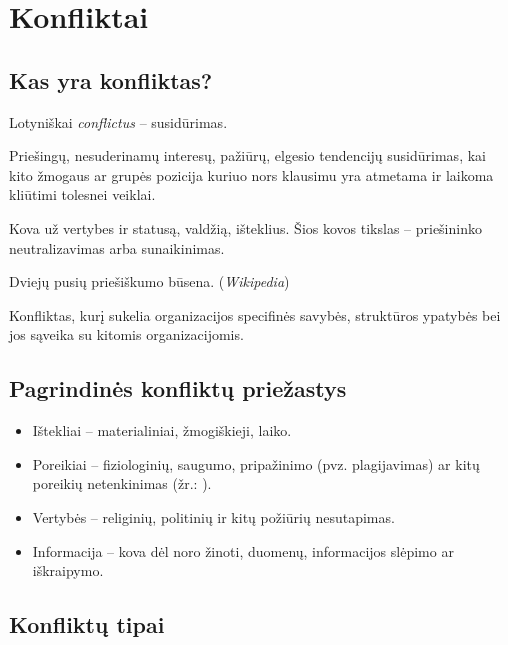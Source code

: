 \chapter{Konfliktai}

\section{Kas yra konfliktas?}

Lotyniškai \emph{conflictus} – susidūrimas.

\begin{defn}[Konfliktas]
  Priešingų, nesuderinamų interesų, pažiūrų, elgesio tendencijų
  susidūrimas, kai kito žmogaus ar grupės pozicija kuriuo nors
  klausimu yra atmetama ir laikoma kliūtimi tolesnei veiklai.
\end{defn}


\begin{defn}[Konfliktas]
  Kova už vertybes ir statusą, valdžią, išteklius. Šios kovos tikslas
  – priešininko neutralizavimas arba sunaikinimas.
\end{defn}

\begin{defn}[Konfliktas]
  Dviejų pusių priešiškumo būsena. (\emph{Wikipedia})
\end{defn}

\begin{defn}
  Konfliktas, kurį sukelia organizacijos specifinės savybės,
  struktūros ypatybės bei jos sąveika su kitomis organizacijomis.
\end{defn}

\section{Pagrindinės konfliktų priežastys}

\begin{itemize}
  \item Ištekliai – materialiniai, žmogiškieji, laiko.
  \item Poreikiai – fiziologinių, saugumo, pripažinimo (pvz. plagijavimas)
    ar kitų poreikių netenkinimas (žr.: ).
  \item Vertybės – religinių, politinių ir kitų požiūrių nesutapimas.
  \item Informacija – kova dėl noro žinoti, duomenų, informacijos
    slėpimo ar iškraipymo.
\end{itemize}

\section{Konfliktų tipai}

